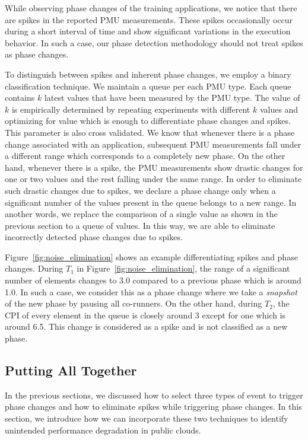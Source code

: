 \documentclass{sig-alternate}
\begin{document}
While observing phase changes of the training applications, we notice that there are spikes in the reported PMU measurements. These spikes occasionally occur during a short interval of time and show significant variations in the execution behavior. In such a case, our phase detection methodology should not treat spikes as phase changes.

To distinguish between spikes and inherent phase changes, we employ a binary classification technique. We maintain a queue per each PMU type. Each queue contains $k$ latest values that have been measured by the PMU type. The value of $k$ is empirically determined by repeating experiments with different $k$ values and optimizing for value which is enough to differentiate phase changes and spikes. This parameter is also cross validated. We know that whenever there is a phase change associated with an application, subsequent PMU measurements fall under a different range which corresponds to a completely new phase. On the other hand, whenever there is a spike, the PMU measurements show drastic changes for one or two values and the rest falling under the same range. In order to eliminate such drastic changes due to spikes, we declare a phase change only when a significant number of the values present in the queue belongs to a new range. In another words, we replace the comparison of a single value as shown in the previous section to a queue of values. In this way, we are able to eliminate incorrectly detected phase changes due to spikes.

Figure~\ref{fig:noise_elimination} shows an example differentiating spikes and phase changes. During $T_{1}$ in Figure~\ref{fig:noise_elimination}, the range of a significant number of elements changes to 3.0 compared to a previous phase which is around 1.0. In such a case, we consider this as a phase change where we take a \textit{snapshot} of the new phase by pausing all co-runners. On the other hand, during $T_{2}$, the CPI of every element in the queue is closely around 3 except for one which is around 6.5. This change is considered as a spike and is not classified as a new phase. 
\subsection{Putting All Together}
\label{subsec:PuttingAllTogether}

In the previous sections, we discussed how to select three types of event to trigger phase changes and how to eliminate spikes while triggering phase changes. In this section, we introduce how we can incorporate these two techniques to identify unintended performance degradation in public clouds.
\end{document}
